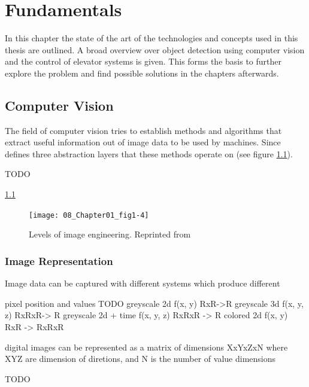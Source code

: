 \chapter{Fundamentals}
\label{chap:sota}
In this chapter the state of the art of the technologies and concepts used in this thesis are outlined.
A broad overview over object detection using computer vision and the control of elevator systems is given.
This forms the basis to further explore the problem and find possible solutions in the chapters afterwards.

\section{Computer Vision}

The field of computer vision tries to establish methods and algorithms 
that extract useful information out of image data to be used by machines. 
Since 
\textcite{zhang2017imageprocessing} defines three abstraction layers that these methods operate on (see figure \ref{fig:sota:imageengineering}).

TODO

\ref{fig:sota:imageengineering}
\begin{figure}[hbt]
	\centering
	\texttt{[image: 08\_Chapter01\_fig1-4]}
	\caption{\label{fig:sota:imageengineering} Levels of image engineering. 
	Reprinted from \textcite[][Chapter~1]{zhang2017imageprocessing}}
\end{figure}

\subsection{Image Representation}
Image data can be captured with different systems which produce different 


pixel position and values
TODO greyscale 2d f(x, y) RxR->R
greyscale 3d f(x, y, z) RxRxR-> R
greyscale 2d + time f(x, y, z) RxRxR -> R
colored 2d f(x, y) RxR -> RxRxR
\autocite[][Chap.~1]{zhang2017imageprocessing}

digital images can be represented as a matrix of dimensions XxYxZxN
where XYZ are dimension of diretions, and N is the number of value dimensions



TODO

